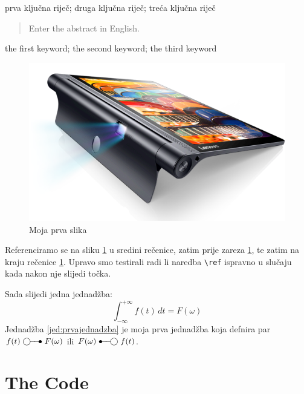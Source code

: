\documentclass[zavrsnirad]{fer}
\begin{document}
\begin{kljucnerijeci}
  prva ključna riječ; druga ključna riječ; treća ključna riječ
\end{kljucnerijeci}


\begin{abstract}
  Enter the abstract in English.
  
  \blindtext 
\end{abstract}

\begin{keywords}
  the first keyword; the second keyword; the third keyword
\end{keywords}


\begin{figure}[htb]
  \centering
  \includegraphics[width=0.38\linewidth]{Figures/lenovo_yoga_tab3_pro_front.png} 
  \caption{Moja prva slika}
  \label{slk:prvaslika}
\end{figure}

Referenciramo se na sliku \ref{slk:prvaslika} u sredini rečenice, zatim prije zareza \ref{slk:prvaslika}, te zatim na kraju rečenice \ref{slk:prvaslika}.
Upravo smo testirali radi li naredba \verb|\ref| ispravno u slučaju kada nakon nje slijedi točka.

Sada slijedi jedna jednadžba:
\begin{equation}
  \label{jed:prvajednadzba}
  \int_{-\infty}^{+\infty}f(t)\,dt=F(\omega)
\end{equation}
Jednadžba \eqref{jed:prvajednadzba} je moja prva jednadžba koja defnira par $f(t)\ufrek F(\omega)$ ili $F(\omega)\uvrem f(t)$.


\backmatter

\chapter{The Code}

\Blindtext
\end{document}
